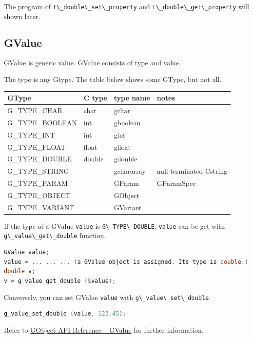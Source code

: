 The program of \passthrough{\lstinline!t\_double\_set\_property!} and
\passthrough{\lstinline!t\_double\_get\_property!} will shown later.

\subsection{GValue}\label{gvalue}

GValue is generic value. GValue consists of type and value.

The type is any Gtype. The table below shows some GType, but not all.

\begin{longtable}[]{@{}llll@{}}
\toprule\noalign{}
GType & C type & type name & notes \\
\midrule\noalign{}
\endhead
\bottomrule\noalign{}
\endlastfoot
G\_TYPE\_CHAR & char & gchar & \\
G\_TYPE\_BOOLEAN & int & gboolean & \\
G\_TYPE\_INT & int & gint & \\
G\_TYPE\_FLOAT & float & gfloat & \\
G\_TYPE\_DOUBLE & double & gdouble & \\
G\_TYPE\_STRING & & gchararray & null-terminated Cstring \\
G\_TYPE\_PARAM & & GParam & GParamSpec \\
G\_TYPE\_OBJECT & & GObject & \\
G\_TYPE\_VARIANT & & GVariant & \\
\end{longtable}

If the type of a GValue \passthrough{\lstinline!value!} is
\passthrough{\lstinline!G\_TYPE\_DOUBLE!},
\passthrough{\lstinline!value!} can be get with
\passthrough{\lstinline!g\_value\_get\_double!} function.

\begin{lstlisting}[language=C]
GValue value;
value = ... ... ... (a GValue object is assigned. Its type is double.)
double v;
v = g_value_get_double (&value);
\end{lstlisting}

Conversely, you can set GValue \passthrough{\lstinline!value!} with
\passthrough{\lstinline!g\_value\_set\_double!}.

\begin{lstlisting}[language=C]
g_value_set_double (value, 123.45);
\end{lstlisting}

Refer to \href{https://docs.gtk.org/gobject/struct.Value.html}{GObject
API Reference -- GValue} for further information.

